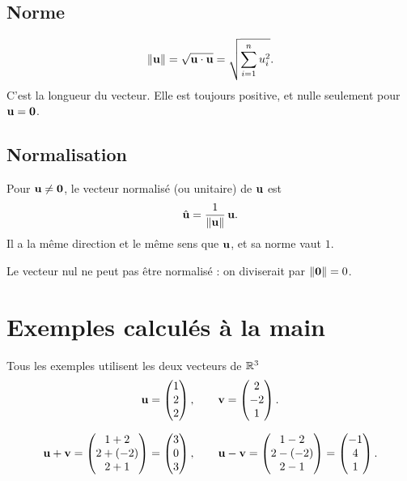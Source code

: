 \subsection{Norme}

\begin{definition}
\[
    \left\|\mathbf{u}\right\| = \sqrt{\mathbf{u} \cdot \mathbf{u}}
    = \sqrt{\sum_{i=1}^{n} u_i^2}.
\]
C'est la longueur du vecteur. Elle est toujours
positive, et nulle seulement pour $\mathbf{u} = \mathbf{0}$.
\end{definition}

\subsection{Normalisation}

\begin{definition}
Pour $\mathbf{u} \neq \mathbf{0}$, le vecteur normalisé
(ou unitaire) de $\mathbf{u}$ est
\[
    \hat{\mathbf{u}} = \frac{1}{\left\|\mathbf{u}\right\|}\,\mathbf{u}.
\]
Il a la même direction et le même sens que
$\mathbf{u}$, et sa norme vaut $1$.
\end{definition}

\begin{importantbox}
Le vecteur nul ne peut pas être normalisé : on
diviserait par $\left\|\mathbf{0}\right\| = 0$.
\end{importantbox}

\section{Exemples calculés à la main}

Tous les exemples utilisent les deux vecteurs de $\mathbb{R}^3$
\[
    \mathbf{u} = \begin{pmatrix} 1 \\ 2 \\ 2 \end{pmatrix},
    \qquad
    \mathbf{v} = \begin{pmatrix} 2 \\ -2 \\ 1 \end{pmatrix}.
\]

\begin{example}
\[
    \mathbf{u} + \mathbf{v} =
    \begin{pmatrix} 1 + 2 \\ 2 + (-2) \\ 2 + 1 \end{pmatrix}
    = \begin{pmatrix} 3 \\ 0 \\ 3 \end{pmatrix},
    \qquad
    \mathbf{u} - \mathbf{v} =
    \begin{pmatrix} 1 - 2 \\ 2 - (-2) \\ 2 - 1 \end{pmatrix}
    = \begin{pmatrix} -1 \\ 4 \\ 1 \end{pmatrix}.
\]
\end{example}


